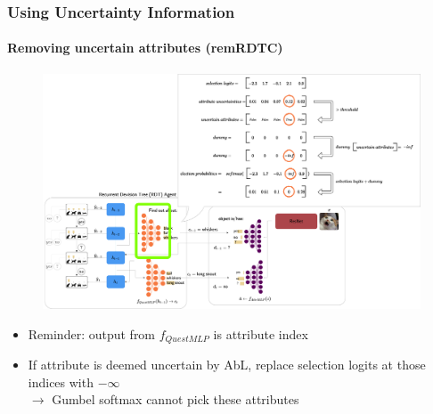 \documentclass[9pt]{beamer}
\begin{document}
\begin{frame}
\frametitle{Using Uncertainty Information}
\framesubtitle{Removing uncertain attributes (remRDTC)}
\begin{figure}
	\includegraphics[width=0.8\linewidth]{images/how_to_remRDTC.pdf}
\end{figure}
\begin{itemize}
	\item Reminder: output from $f_{QuestMLP}$ is attribute index %
	\item If attribute is deemed uncertain by AbL, replace selection logits at those indices with $-\infty$
	\\ $\rightarrow$ Gumbel softmax cannot pick these attributes
\end{itemize}
\end{frame}
\end{document}

